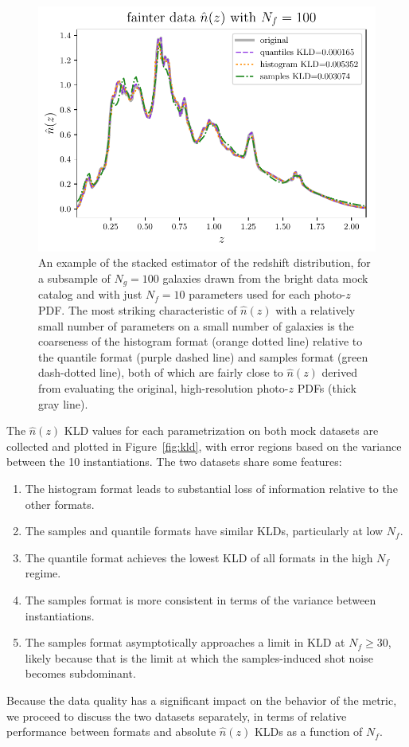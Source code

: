 \documentclass[\docopts]{\docclass}
\newcommand{\pz}{photo-$z$ PDF}
\newcommand{\mgdata}{bright\xspace}
\begin{document}
\begin{figure}
  \begin{center}
    \includegraphics[width=\columnwidth]{figures/stacked.pdf}
    \caption{An example of the stacked estimator of the redshift distribution, 
for a subsample of $N_{g}=100$ galaxies drawn from the \mgdata data mock 
catalog and with just $N_{f}=10$ parameters used for each \pz.
    The most striking characteristic of $\hat{n}(z)$ with a relatively small 
number of parameters on a small number of galaxies is the coarseness of the 
histogram format (orange dotted line) relative to the quantile format (purple 
dashed line) and samples format (green dash-dotted line), both of which are 
fairly close to $\hat{n}(z)$ derived from evaluating the original, 
high-resolution \pz s (thick gray line).
    \label{fig:stacked}}
  \end{center}
\end{figure}

The $\hat{n}(z)$ KLD values for each parametrization on both mock datasets are 
collected and plotted in Figure~\ref{fig:kld}, with error regions based on the 
variance between the 10 instantiations.
The two datasets share some features:
\begin{enumerate}
\item The histogram format leads to substantial loss of information relative to 
the other formats.
\item The samples and quantile formats have similar KLDs, particularly at low 
$N_{f}$.
\item The quantile format achieves the lowest KLD of all formats in the high 
$N_{f}$ regime.
\item The samples format is more consistent in terms of the variance between 
instantiations.
\item The samples format asymptotically approaches a limit in KLD at 
$N_{f}\geq30$, likely because that is the limit at which the samples-induced 
shot noise becomes subdominant.
\end{enumerate}
Because the data quality has a significant impact on the behavior of the 
metric, we proceed to discuss the two datasets separately, in terms of relative 
performance between formats and absolute $\hat{n}(z)$ KLDs as a function of 
$N_{f}$.
\end{document}
